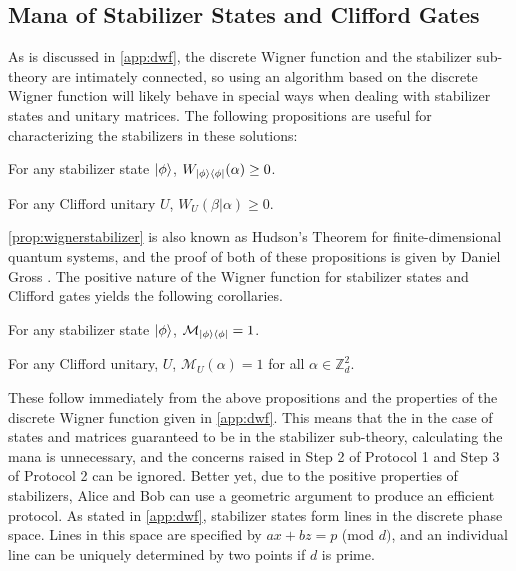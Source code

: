 \documentclass[../3Wworkreport.tex]{subfiles}
\begin{document}
\subsection{Mana of Stabilizer States and Clifford Gates}
\label{subsec:cr_stabilizer}
As is discussed in \autoref{app:dwf}, the discrete Wigner function and the stabilizer sub-theory are intimately connected, so using an algorithm based on the discrete Wigner function will likely behave in special ways when dealing with stabilizer states and unitary matrices. The following propositions are useful for characterizing the stabilizers in these solutions:
\begin{prop}
	For any stabilizer state $\ket{\phi}$, $W_{\ket{\phi}\bra{\phi}}(\alpha) \ge 0$.
	\label{prop:wignerstabilizer}
\end{prop}
\begin{prop}
	For any Clifford unitary $U$, $W_U(\beta|\alpha) \ge 0$.
	\label{prop:wignerclifford}
\end{prop}
\autoref{prop:wignerstabilizer} is also known as Hudson's Theorem for finite-dimensional quantum systems, and the proof of both of these propositions is given by Daniel Gross \cite{Gross2006}. The positive nature of the Wigner function for stabilizer states and Clifford gates yields the following corollaries.
\begin{corol}
	For any stabilizer state $\ket{\phi}$, $\mathcal{M}_{\ket{\phi}\bra{\phi}} = 1$.
	\label{corol:manastab}
\end{corol}
\begin{corol}
	For any Clifford unitary, $U$, $\mathcal{M}_U(\alpha) = 1$ for all $\alpha \in \mathbb{Z}_d^2$.
	\label{corol:manaclif}
\end{corol}
These follow immediately from the above propositions and the properties of the discrete Wigner function given in \autoref{app:dwf}. This means that the in the case of states and matrices guaranteed to be in the stabilizer sub-theory, calculating the mana is unnecessary, and the concerns raised in Step 2 of Protocol 1 and Step 3 of Protocol 2 can be ignored. Better yet, due to the positive properties of stabilizers, Alice and Bob can use a geometric argument to produce an efficient protocol. As stated in \autoref{app:dwf}, stabilizer states form lines in the discrete phase space. Lines in this space are specified by $ax + bz = p$ (mod $d)$, and an individual line can be uniquely determined by two points if $d$ is prime.\\ \\
\end{document}
